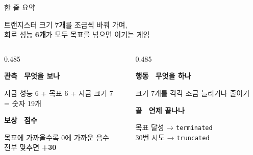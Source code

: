 \documentclass[aspectratio=169,11pt,xcolor=table]{beamer}
\newcommand{\boxtitle}[1]{{\bfseries\color{brand}#1}\par\smallskip}
\newcommand{\cc}[1]{\texttt{#1}}
\begin{document}
\begin{frame}{한 줄 요약}
  \begin{keybox}[colback=accent!9,colframe=accent!9]
    \large 트랜지스터 크기 \textbf{7개}를 조금씩 바꿔 가며,\\
    회로 성능 \textbf{6개}가 모두 목표를 넘으면 이기는 게임
  \end{keybox}
  \vspace{0.3em}
  \begin{columns}[T,onlytextwidth]
    \begin{column}{0.485\textwidth}
      \begin{keybox}[equal height group=sum1]
        \boxtitle{관측 \ {\normalfont\small 무엇을 보나}}
        지금 성능 6 + 목표 6 + 지금 크기 7\\
        = 숫자 19개
      \end{keybox}
      \begin{keybox}[equal height group=sum2]
        \boxtitle{보상 \ {\normalfont\small 점수}}
        목표에 가까울수록 0에 가까운 음수\\
        전부 맞추면 \textbf{+30}
      \end{keybox}
    \end{column}
    \begin{column}{0.485\textwidth}
      \begin{keybox}[equal height group=sum1]
        \boxtitle{행동 \ {\normalfont\small 무엇을 하나}}
        크기 7개를 각각 조금 늘리거나 줄이기
      \end{keybox}
      \begin{keybox}[equal height group=sum2]
        \boxtitle{끝 \ {\normalfont\small 언제 끝나나}}
        목표 달성 → \cc{terminated}\\
        30번 시도 → \cc{truncated}
      \end{keybox}
    \end{column}
  \end{columns}
\end{frame}
\end{document}
